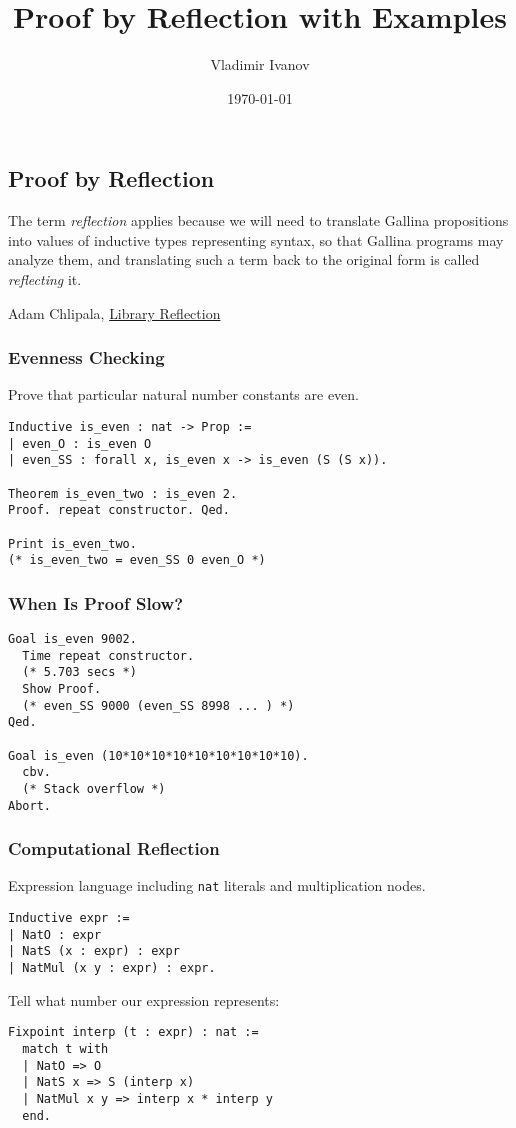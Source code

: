 \documentclass{beamer}
\title{Proof by Reflection with Examples}
\author{Vladimir Ivanov}
\date{\today}
\begin{document}
\begin{frame}
  \maketitle
\end{frame}

\begin{frame}
  \section{Proof by Reflection}
  \setlength{\epigraphwidth}{\textwidth}
  \epigraph{\justifying
    The term \textit{reflection} applies because we will need to translate Gallina propositions into values of inductive types representing syntax, so that Gallina programs may analyze them, and translating such a term back to the original form is called \textit{reflecting} it.
  }{Adam Chlipala,  \href{http://adam.chlipala.net/cpdt/html/Reflection.html}{Library Reflection}}
\end{frame}

\begin{frame}[fragile]
  \frametitle{Evenness Checking}
  Prove that particular natural number constants are even.
\begin{verbatim}
Inductive is_even : nat -> Prop :=
| even_O : is_even O
| even_SS : forall x, is_even x -> is_even (S (S x)).

Theorem is_even_two : is_even 2.
Proof. repeat constructor. Qed.

Print is_even_two.
(* is_even_two = even_SS 0 even_O *)
\end{verbatim}
\end{frame}

\begin{frame}[fragile]
  \frametitle{When Is Proof Slow?}
\begin{verbatim}
Goal is_even 9002.
  Time repeat constructor.
  (* 5.703 secs *)
  Show Proof.
  (* even_SS 9000 (even_SS 8998 ... ) *)
Qed.

Goal is_even (10*10*10*10*10*10*10*10*10).
  cbv.
  (* Stack overflow *)
Abort.
\end{verbatim}
\end{frame}

\begin{frame}[fragile]
  \frametitle{Computational Reflection}
  Expression language including \texttt{nat} literals and multiplication nodes.
\begin{verbatim}
Inductive expr :=
| NatO : expr
| NatS (x : expr) : expr
| NatMul (x y : expr) : expr.
\end{verbatim}
  Tell what number our expression represents:
\begin{verbatim}
Fixpoint interp (t : expr) : nat :=
  match t with
  | NatO => O
  | NatS x => S (interp x)
  | NatMul x y => interp x * interp y
  end.
\end{verbatim}
\end{frame}
\end{document}
